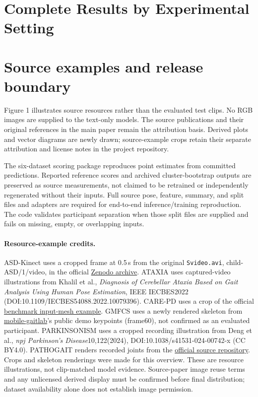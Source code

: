 \clearpage
\section{Complete Results by Experimental Setting}









\clearpage
\section{Source examples and release boundary}
Figure 1 illustrates source resources rather than the evaluated test clips. No RGB images are supplied to the text-only models. The source publications and their original references in the main paper remain the attribution basis. Derived plots and vector diagrams are newly drawn; source-example crops retain their separate attribution and license notes in the project repository.

The six-dataset scoring package reproduces point estimates from committed predictions. Reported reference scores and archived cluster-bootstrap outputs are preserved as source measurements, not claimed to be retrained or independently regenerated without their inputs. Full source pose, feature, summary, and split files and adapters are required for end-to-end inference/training reproduction. The code validates participant separation when those split files are supplied and fails on missing, empty, or overlapping inputs.

\paragraph{Resource-example credits.}
ASD-Kinect uses a cropped frame at 0.5\,s from the original \texttt{Svideo.avi}, child-ASD/1/video, in the official \href{https://zenodo.org/records/4025120}{Zenodo archive}. ATAXIA uses captured-video illustrations from Khalil et al., \emph{Diagnosis of Cerebellar Ataxia Based on Gait Analysis Using Human Pose Estimation}, IEEE IECBES2022 (DOI:10.1109/IECBES54088.2022.10079396). CARE-PD uses a crop of the official \href{https://neurips2025.care-pd.ca/static/images/benchmark.png}{benchmark input-mesh example}. GMFCS uses a newly rendered skeleton from \href{https://github.com/stanfordnmbl/mobile-gaitlab}{mobile-gaitlab}'s public demo keypoints (frame60), not confirmed as an evaluated participant. PARKINSONISM uses a cropped recording illustration from Deng et al., \emph{npj Parkinson's Disease}10,122(2024), DOI:10.1038/s41531-024-00742-x (CC BY4.0). PATHOGAIT renders recorded joints from the \href{https://github.com/kooksung/pathological_gait_datasets}{official source repository}. Crops and skeleton renderings were made for this overview. These are resource illustrations, not clip-matched model evidence. Source-paper image reuse terms and any unlicensed derived display must be confirmed before final distribution; dataset availability alone does not establish image permission.

